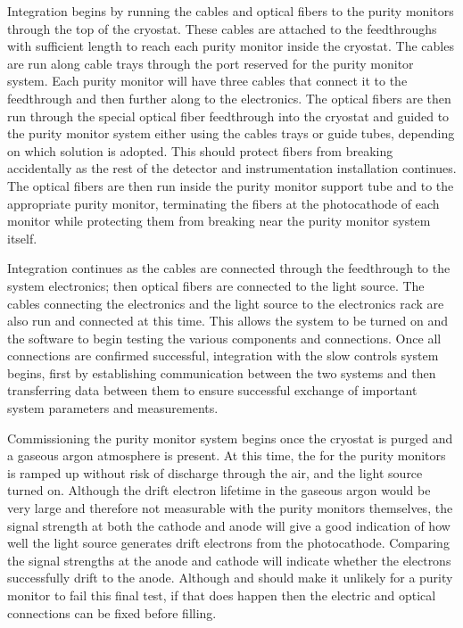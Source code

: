 Integration %
begins by running the   cables and optical fibers to the purity monitors through the top of the cryostat.  These cables %
are attached to the    feedthroughs with sufficient length to reach each purity monitor inside the cryostat.  
The cables %
are run along cable trays through the port reserved for the purity monitor system. 
Each purity monitor will have three   cables that connect it to the feedthrough and then further along to the   electronics.  The optical fibers %
are then run through the special optical fiber feedthrough into the cryostat and %
guided to the purity monitor system either using the cables trays or guide tubes, depending on which solution is adopted. 
This should protect fibers from breaking accidentally as the rest of the detector and instrumentation installation continues.  The optical fibers %
are then run inside the purity monitor support tube and to the appropriate purity monitor, terminating the fibers at the photocathode of each monitor while protecting them from breaking near the purity monitor system itself.

Integration %
continues as the   cables are connected through the feedthrough to the system   electronics; then optical fibers are connected to the light source.  The cables connecting the  electronics and the light source to the electronics rack %
are also run and connected at this time.  This allows the system to be turned on and the software to begin testing the various components and connections.  Once all connections are confirmed successful, integration with the slow controls system begins, first by establishing communication between the two systems and then transferring data between them to ensure successful exchange of important system parameters and measurements.  

Commissioning the purity monitor system %
begins once the cryostat is purged and a gaseous argon atmosphere is present.  At this time, the  for the purity monitors 
  is ramped up without risk of discharge through the air, and the light source turned on.  Although the drift electron lifetime in the gaseous argon would be very large and therefore not %
  measurable with the purity monitors themselves, the signal strength at both the cathode and anode will %
  give a good indication of how well the light source generates drift electrons from the photocathode. %
  Comparing the signal strengths at the anode and cathode will indicate whether the electrons successfully drift to the anode.
  Although  and  should make it unlikely for a purity monitor to fail this final test, if that does happen then the electric and optical connections can be fixed before filling.

